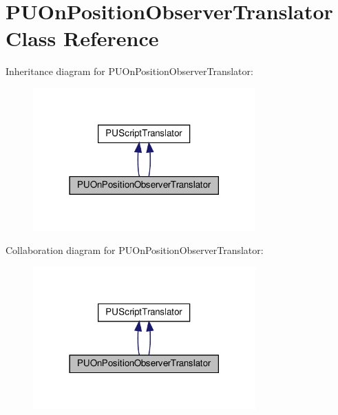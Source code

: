\hypertarget{classPUOnPositionObserverTranslator}{}\section{P\+U\+On\+Position\+Observer\+Translator Class Reference}
\label{classPUOnPositionObserverTranslator}


Inheritance diagram for P\+U\+On\+Position\+Observer\+Translator\+:
\nopagebreak
\begin{figure}[H]
\begin{center}
\leavevmode
\includegraphics[width=242pt]{classPUOnPositionObserverTranslator__inherit__graph}
\end{center}
\end{figure}


Collaboration diagram for P\+U\+On\+Position\+Observer\+Translator\+:
\nopagebreak
\begin{figure}[H]
\begin{center}
\leavevmode
\includegraphics[width=242pt]{classPUOnPositionObserverTranslator__coll__graph}
\end{center}
\end{figure}
